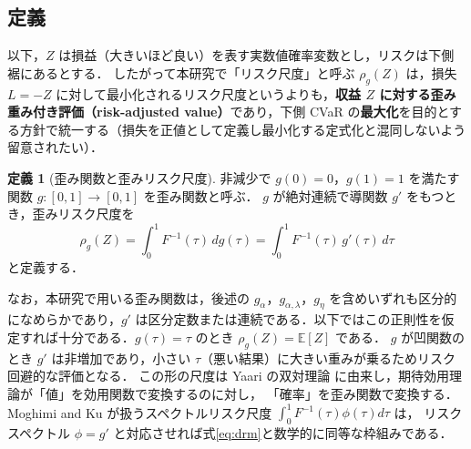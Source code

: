 \documentclass[a4paper,10pt]{jsarticle}
\theoremstyle{definition}
\newtheorem{definition}{定義}[section]
\newcommand{\Finv}{F^{-1}}
\newcommand{\E}{\mathbb{E}}
\begin{document}
\subsection{定義}
以下，$Z$ は損益（大きいほど良い）を表す実数値確率変数とし，リスクは下側裾にあるとする．
したがって本研究で「リスク尺度」と呼ぶ $\rho_g(Z)$ は，損失 $L=-Z$ に対して最小化されるリスク尺度というよりも，\textbf{収益 $Z$ に対する歪み重み付き評価（risk-adjusted value）}であり，下側 CVaR の\textbf{最大化}を目的とする方針で統一する（損失を正値として定義し最小化する定式化と混同しないよう留意されたい）．
\begin{definition}[歪み関数と歪みリスク尺度]
非減少で $g(0)=0$，$g(1)=1$ を満たす関数 $g:[0,1]\to[0,1]$ を歪み関数と呼ぶ．
$g$ が絶対連続で導関数 $g'$ をもつとき，歪みリスク尺度を
\begin{equation}
  \rho_g(Z)=\int_0^1\Finv(\tau)\,dg(\tau)=\int_0^1\Finv(\tau)\,g'(\tau)\,d\tau
  \label{eq:drm}
\end{equation}
と定義する．
\end{definition}
なお，本研究で用いる歪み関数は，後述の $g_\alpha$，$g_{\alpha,\lambda}$，$g_\eta$ を含めいずれも区分的になめらかであり，$g'$ は区分定数または連続である．以下ではこの正則性を仮定すれば十分である．$g(\tau)=\tau$ のとき $\rho_g(Z)=\E[Z]$ である．
$g$ が凹関数のとき $g'$ は非増加であり，小さい $\tau$（悪い結果）に大きい重みが乗るためリスク回避的な評価となる．
この形の尺度は Yaari の双対理論 \cite{yaari1987dual} に由来し，期待効用理論が「値」を効用関数で変換するのに対し，
「確率」を歪み関数で変換する．
Moghimi and Ku \cite{moghimi2025beyond} が扱うスペクトルリスク尺度 $\int_0^1\Finv(\tau)\phi(\tau)d\tau$ は，
リスクスペクトル $\phi=g'$ と対応させれば式\eqref{eq:drm}と数学的に同等な枠組みである．
\end{document}
